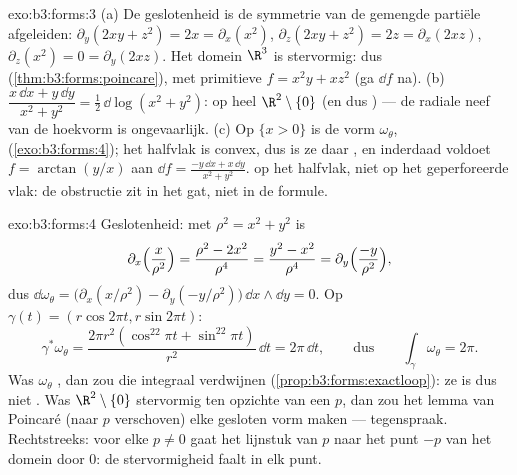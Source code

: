 \begin{solution}{exo:b3:forms:3}
(a) De geslotenheid is de symmetrie van de gemengde partiële
afgeleiden: $\partial_y(2xy + z^2) = 2x = \partial_x(x^2)$,
$\partial_z(2xy + z^2) = 2z = \partial_x(2xz)$, $\partial_z(x^2)
= 0 = \partial_y(2xz)$. Het domein $\R^3$ is stervormig: dus
 (\cref{thm:b3:forms:poincare}), met primitieve $f = x^2y +
xz^2$ (ga $\dd f$ na).
(b) $\dfrac{x\,\dd x + y\,\dd y}{x^2 + y^2} = \tfrac12\,\dd
\log(x^2 + y^2)$:  op heel $\R^2\setminus\{0\}$ (en dus
) --- de radiale neef van de hoekvorm is ongevaarlijk.
(c) Op $\{x > 0\}$ is de vorm $\omega_\theta$, 
(\cref{exo:b3:forms:4}); het halfvlak is convex, dus is ze daar
, en inderdaad voldoet $f = \arctan(y/x)$ aan $\dd f =
\frac{-y\,\dd x + x\,\dd y}{x^2 + y^2}$.  op het halfvlak,
niet  op het geperforeerde vlak: de obstructie zit in het
gat, niet in de formule.
\end{solution}

\begin{solution}{exo:b3:forms:4}
Geslotenheid: met $\rho^2 = x^2 + y^2$ is
\[
\partial_x\Bigl(\frac{x}{\rho^2}\Bigr) = \frac{\rho^2 -
2x^2}{\rho^4} = \frac{y^2 - x^2}{\rho^4} =
\partial_y\Bigl(\frac{-y}{\rho^2}\Bigr),
\]
dus $\dd\omega_\theta = \bigl(\partial_x(x/\rho^2) -
\partial_y(-y/\rho^2)\bigr)\,\dd x\wedge\dd y = 0$. Op $\gamma(t)
= (r\cos2\pi t, r\sin2\pi t)$:
\[
\gamma^*\omega_\theta = \frac{2\pi r^2(\cos^22\pi t +
\sin^22\pi t)}{r^2}\,\dd t = 2\pi\,\dd t,
\qquad\text{dus}\qquad
\int_\gamma\omega_\theta = 2\pi .
\] Was $\omega_\theta$ , dan zou die integraal verdwijnen
(\cref{prop:b3:forms:exactloop}): ze is dus niet . Was
$\R^2\setminus\{0\}$ stervormig ten opzichte van een $p$, dan
zou het lemma van Poincaré (naar $p$ verschoven) elke gesloten
vorm  maken --- tegenspraak. Rechtstreeks: voor elke $p \neq
0$ gaat het lijnstuk van $p$ naar het punt $-p$ van het domein
door $0$: de stervormigheid faalt in elk punt.
\end{solution}

